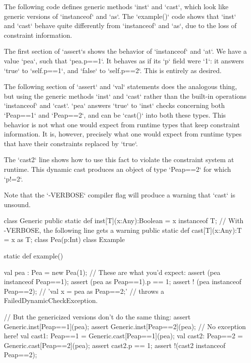 \begin{ex}
The following code defines generic methods \xcd`inst` and \xcd`cast`, which
look like generic versions of \xcd`instanceof` and \xcd`as`.  The
\xcd`example()` code shows that \xcd`inst` and \xcd`cast` behave quite
differently from \xcd`instanceof` and \xcd`as`, due to the loss of constraint
information.  

The first section of \xcd`assert`s shows the behavior of \xcd`instanceof` and
\xcd`at`.  We have a value \xcd`pea`, such that \xcd`pea.p==1`.
It behaves as if its \xcd`p` field were \xcd`1`: it answers \xcd`true` to 
\xcd`self.p==1`, and \xcd`false` to \xcd`self.p==2`.  This is entirely as
desired.

The following section of \xcd`assert` and \xcd`val` statements does the
analogous thing, but using the generic methods \xcd`inst` and \xcd`cast`
rather than the built-in operations \xcd`instanceof` and \xcd`cast`.
\xcd`pea` answers \xcd`true` to \xcd`inst` checks concerning both
\xcd`Pea{p==1}` and \xcd`Pea{p==2}`, and can be \xcd`cast()` into both these
types.  This behavior is not what one would expect from runtime types that
keep constraint information.  It is, however, precisely what one would expect
from runtime types that have their constraints replaced by \xcd`true`.  

The \xcd`cast2` line shows how to use this fact to violate the constraint
system at runtime.   This dynamic cast produces an object of type
\xcd`Pea{p==2}` for which \xcd`p!=2`.  

Note that the \xcd`-VERBOSE` compiler flag will produce a warning that 
\xcd`cast` is unsound.  

\begin{xten}
class Generic {
  public static def inst[T](x:Any):Boolean = x instanceof T;
  // With -VERBOSE, the following line gets a warning
  public static def cast[T](x:Any):T       = x as T;
}
class Pea(p:Int) {}
class Example{
  static def example() {
     val pea : Pea = new Pea(1);
     // These are what you'd expect: 
     assert (pea instanceof Pea{p==1});
     assert (pea as Pea{p==1}).p == 1;
     assert ! (pea instanceof Pea{p==2}); 
     // 'val x = pea as Pea{p==2};' 
     // throws a FailedDynamicCheckException.

     // But the genericized versions don't do the same thing:
     assert Generic.inst[Pea{p==1}](pea);
     assert Generic.inst[Pea{p==2}](pea);
     // No exception here!
     val cast1: Pea{p==1} = Generic.cast[Pea{p==1}](pea);
     val cast2: Pea{p==2} = Generic.cast[Pea{p==2}](pea);
     assert cast2.p == 1;
     assert !(cast2 instanceof Pea{p==2});
  }
}

\end{xten}
\end{ex}

